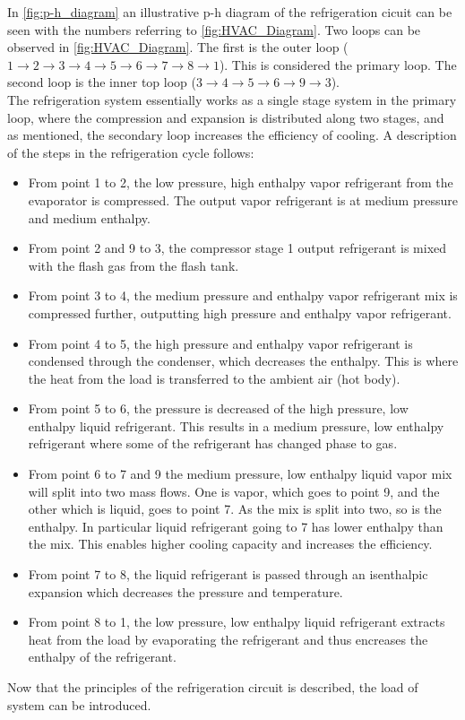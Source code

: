 In \cref{fig:p-h_diagram} an illustrative p-h diagram of the refrigeration cicuit can be seen with the numbers referring to \cref{fig:HVAC_Diagram}. Two loops can be observed in \cref{fig:HVAC_Diagram}. The first is the outer loop ($1 \rightarrow 2\rightarrow 3 \rightarrow 4 \rightarrow 5 \rightarrow 6 \rightarrow 7 \rightarrow 8 \rightarrow 1$). This is considered the primary loop. The second loop is the inner top loop ($3 \rightarrow 4 \rightarrow 5 \rightarrow 6 \rightarrow 9 \rightarrow 3$). \\
The refrigeration system essentially works as a single stage system in the primary loop, where the compression and expansion is distributed along two stages, and as mentioned, the secondary loop  increases the efficiency of cooling. A description of the steps in the refrigeration cycle follows:
\begin{itemize}
	\item From point 1 to 2, the low pressure, high enthalpy vapor refrigerant from the evaporator is compressed. The output vapor refrigerant is at medium pressure and medium enthalpy.
	\item From point 2 and 9 to 3, the compressor stage 1 output refrigerant is mixed with the flash gas from the flash tank.
	\item From point 3 to 4, the medium pressure and enthalpy vapor refrigerant mix is compressed further, outputting high pressure and enthalpy vapor refrigerant.
	\item From point 4 to 5, the high pressure and enthalpy vapor refrigerant is condensed through the condenser, which decreases the enthalpy. This is where the heat from the load is transferred to the ambient air (hot body).
	\item From point 5 to 6, the pressure is decreased of the high pressure, low enthalpy liquid refrigerant. This results in a medium pressure, low enthalpy refrigerant where some of the refrigerant has changed phase to gas.
	\item From point 6 to 7 and 9 the medium pressure, low enthalpy liquid vapor mix will split into two mass flows. One is vapor, which goes to point 9, and the other which is liquid, goes to point 7. As the mix is split into two, so is the enthalpy. In particular liquid refrigerant going to 7 has lower enthalpy than the mix. This enables higher cooling capacity and increases the efficiency.
	\item From point 7 to 8, the liquid refrigerant is passed through an isenthalpic expansion which decreases the pressure and temperature.
	\item From point 8 to 1, the low pressure, low enthalpy liquid refrigerant extracts heat from the load by evaporating the refrigerant and thus encreases the enthalpy of the refrigerant.
\end{itemize}
Now that the principles of the refrigeration circuit is described, the load of system can be introduced.

